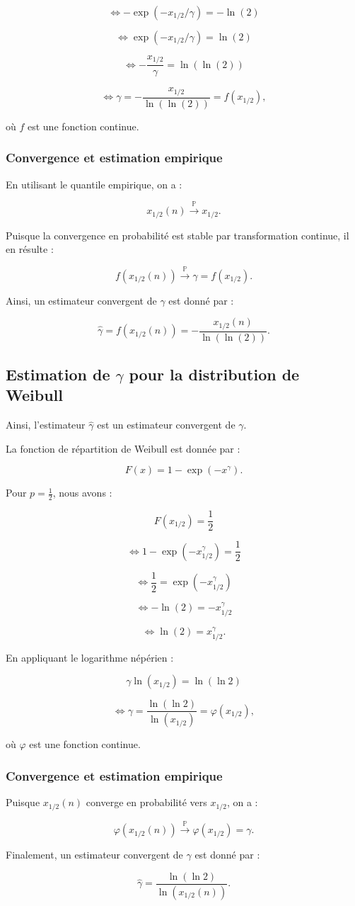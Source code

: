 \documentclass{article}
\begin{document}
\[
\iff -\exp(-x_{1/2}/\gamma) = -\ln(2)
\]

\[
\iff \exp(-x_{1/2}/\gamma) = \ln(2)
\]

\[
\iff -\frac{x_{1/2}}{\gamma} = \ln(\ln(2))
\]

\[
\iff \gamma = -\frac{x_{1/2}}{\ln(\ln(2))} = f(x_{1/2}),
\]

où \(f\) est une fonction continue.

\subsubsection{Convergence et estimation empirique}

En utilisant le quantile empirique, on a :

\[
x_{1/2}(n) \xrightarrow{\mathbb{P}} x_{1/2}.
\]

Puisque la convergence en probabilité est stable par transformation continue, il en résulte :

\[
f(x_{1/2}(n)) \xrightarrow{\mathbb{P}} \gamma = f(x_{1/2}).
\]

Ainsi, un estimateur convergent de \(\gamma\) est donné par :

\[
\hat{\gamma} = f(x_{1/2}(n)) = -\frac{x_{1/2}(n)}{\ln(\ln(2))}.
\]

\subsection{Estimation de \(\gamma\) pour la distribution de Weibull}

Ainsi, l'estimateur \(\hat{\gamma}\) est un estimateur convergent de \(\gamma\).

La fonction de répartition de Weibull est donnée par :

\[
F(x) = 1 - \exp(-x^{\gamma}).
\]

Pour \(p = \frac{1}{2}\), nous avons :

\[
F(x_{1/2}) = \frac{1}{2}
\]

\[
\iff 1 - \exp(-x_{1/2}^{\gamma}) = \frac{1}{2}
\]

\[
\iff \frac{1}{2} = \exp(-x_{1/2}^{\gamma})
\]

\[
\iff -\ln(2) = -x_{1/2}^{\gamma}
\]

\[
\iff \ln(2) = x_{1/2}^{\gamma}.
\]

En appliquant le logarithme népérien :

\[
\gamma \ln(x_{1/2}) = \ln(\ln 2)
\]

\[
\iff \gamma = \frac{\ln(\ln 2)}{\ln(x_{1/2})} = \varphi(x_{1/2}),
\]

où \(\varphi\) est une fonction continue.

\subsubsection{Convergence et estimation empirique}

Puisque \(x_{1/2}(n)\) converge en probabilité vers \(x_{1/2}\), on a :

\[
\varphi(x_{1/2}(n)) \xrightarrow{\mathbb{P}} \varphi(x_{1/2}) = \gamma.
\]

Finalement, un estimateur convergent de \(\gamma\) est donné par :

\[
\hat{\gamma} = \frac{\ln(\ln 2)}{\ln(x_{1/2}(n))}.
\]
\end{document}

